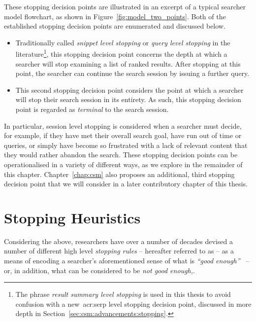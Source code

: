 These stopping decision points are illustrated in an excerpt of a typical searcher model flowchart, as shown in Figure~\ref{fig:model_two_points}. Both of the established stopping decision points are enumerated and discussed below.

\vspace*{-4mm}
\begin{itemize}
    \item[\blueboxbold{1}]{ Traditionally called \emph{snippet level stopping} or \emph{query level stopping} in the literature\footnote{The phrase \emph{result summary level stopping} is used in this thesis to avoid confusion with a new~\gls{acr:serp} level stopping decision point, discussed in more depth in Section~\ref{sec:csm:advancements:stopping}.}, this stopping decision point concerns the depth at which a searcher will stop examining a list of ranked results. After stopping at this point, the searcher can continue the search session by issuing a further query.}
    \item[\blueboxbold{2}]{ This second stopping decision point considers the point at which a searcher will stop their search session in its entirety. As such, this stopping decision point is regarded as \emph{terminal} to the search session.}
\end{itemize}
\vspace*{-4mm}

In particular, session level stopping is considered when a searcher must decide, for example, if they have met their overall search goal, have run out of time or queries, or simply have become so frustrated with a lack of relevant content that they would rather abandon the search. These stopping decision points can be operationalised in a variety of different ways, as we explore in the remainder of this chapter. Chapter~\ref{chap:csm} also proposes an additional, third stopping decision point that we will consider in a later contributory chapter of this thesis.

\section{Stopping Heuristics}\label{sec:stopping_background:heuristics}
Considering the above, researchers have over a number of decades devised a number of different high level \emph{stopping rules} -- hereafter referred to as  -- as a means of encoding a searcher's aforementioned sense of what is \emph{``good enough''}~\citep{zach2005enough_is_enough} -- or, in addition, what can be considered to be \emph{not good enough,}.

